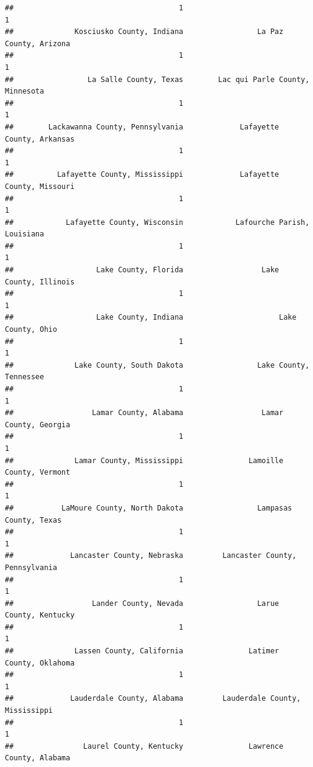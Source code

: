 \documentclass[
]{article}
\begin{document}
\begin{verbatim}
##                                      1                                      1 
##              Kosciusko County, Indiana                 La Paz County, Arizona 
##                                      1                                      1 
##                 La Salle County, Texas        Lac qui Parle County, Minnesota 
##                                      1                                      1 
##        Lackawanna County, Pennsylvania             Lafayette County, Arkansas 
##                                      1                                      1 
##          Lafayette County, Mississippi             Lafayette County, Missouri 
##                                      1                                      1 
##            Lafayette County, Wisconsin            Lafourche Parish, Louisiana 
##                                      1                                      1 
##                   Lake County, Florida                  Lake County, Illinois 
##                                      1                                      1 
##                   Lake County, Indiana                      Lake County, Ohio 
##                                      1                                      1 
##              Lake County, South Dakota                 Lake County, Tennessee 
##                                      1                                      1 
##                  Lamar County, Alabama                  Lamar County, Georgia 
##                                      1                                      1 
##              Lamar County, Mississippi               Lamoille County, Vermont 
##                                      1                                      1 
##           LaMoure County, North Dakota                 Lampasas County, Texas 
##                                      1                                      1 
##             Lancaster County, Nebraska         Lancaster County, Pennsylvania 
##                                      1                                      1 
##                  Lander County, Nevada                 Larue County, Kentucky 
##                                      1                                      1 
##              Lassen County, California               Latimer County, Oklahoma 
##                                      1                                      1 
##             Lauderdale County, Alabama         Lauderdale County, Mississippi 
##                                      1                                      1 
##                Laurel County, Kentucky               Lawrence County, Alabama 

\end{verbatim}
\end{document}

